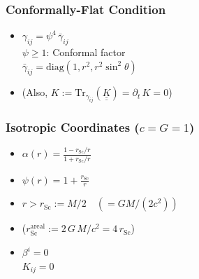 \documentclass{beamer}
\newcommand{\p}{\partial}
\newcommand{\ul}{\underline}
\newcommand{\rsc}{r_{\mathrm{Sc}}}
\begin{document}
\begin{frame}
\frametitle{Conformally-Flat Condition}

  \citet{wmm1996,cc2009}\vspace{1em}

  \begin{itemize}[<+->]
    \item[]
      $\gamma_{ij}=\psi^{4}\,\bar{\gamma}_{ij}$\\[1em]
      $\psi\geq1$: Conformal factor\\[1em]
      $\bar{\gamma}_{ij}
      =\mathrm{diag}\left(1,r^{2},r^{2}\sin^{2}\theta\right)$\\[1em]
    \item[]
      (Also, $K:=\mathrm{Tr}_{\gamma_{ij}}\left(\ul{\ul{K}}\right)=\p_{t}\,K=0$)
  \end{itemize}

\end{frame}

\begin{frame}
\frametitle{Isotropic Coordinates ($c=G=1$)}

  \citet{bs2010}\vspace{1em}

  \begin{itemize}[<+->]
    \item[]
      $\alpha\left(r\right)=
      \frac{1-\rsc/r}{1+\rsc/r}$\\[1em]
    \item[]
      $\psi\left(r\right)=
      1+\frac{\rsc}{r}$\\[1em]
    \item[]
      $r>\rsc:=M/2\hspace{1em}\left(=GM/\left(2c^{2}\right)\right)$\\[1em]
    \item[]
      ($\rsc^{\mathrm{areal}}:=2\,G\,M/c^{2}=4\,\rsc$)\\[1em]
    \item[]
      $\beta^{i}=0$\\[1em]
      $K_{ij}=0$
  \end{itemize}

\end{frame}
\end{document}
